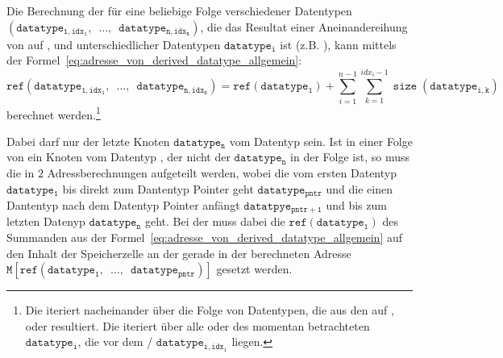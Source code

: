 \begin{Special_Paragraph}
  Die Berechnung der  für eine beliebige Folge verschiedener Datentypen $(\mathtt{datatype_{1, idx_1},\enspace\ldots,\enspace datatype_{n, idx_n}})$, die das Resultat einer Aneinandereihung von  auf ,  und  unterschiedlicher Datentypen $\mathtt{datatype_{i}}$ ist (z.B. ), kann mittels der Formel~\ref{eq:adresse_von_derived_datatype_allgemein}:
  \begin{equation}
  \mathtt{ref(datatype_{1, idx_1},\enspace\ldots,\enspace datatype_{n, idx_n})} = \mathtt{ref(datatype_1)} + \sum_{i=1}^{n-1}\sum_{k=1}^{idx_i - 1} \mathtt{\operatorname{size}(datatype_{i, k})}
  \label{eq:adresse_von_derived_datatype_allgemein}
  \end{equation}
  berechnet werden.\footnote{Die  iteriert nacheinander über die Folge von Datentypen, die aus den  auf ,  oder  resultiert. Die  iteriert über alle  oder  des momentan betrachteten  $\mathtt{datatype_i}$, die vor dem  /  $\mathtt{datatype_{i, idx_i}}$ liegen.}

  Dabei darf nur der letzte Knoten $\mathtt{datatype_n}$ vom Datentyp  sein. Ist in einer Folge von   ein Knoten vom Datentyp , der nicht der  $\mathtt{datatype_n}$ in der Folge ist, so muss die  in $2$ Adressberechnungen aufgeteilt werden, wobei die  vom ersten Datentyp $\mathtt{datatype_1}$ bis direkt zum Dantentyp Pointer geht $\mathtt{datatype_{pntr}}$ und die  einen Dantentyp nach dem Datentyp Pointer anfängt $\mathtt{datatpye_{pntr+1}}$ und bis zum letzten Datenyp $\mathtt{datatype_n}$ geht. Bei der  muss dabei die  $\mathtt{ref(datatype_1)}$ des Summanden aus der Formel~\ref{eq:adresse_von_derived_datatype_allgemein} auf den Inhalt der Speicherzelle an der gerade in der  berechneten Adresse $\mathtt{M\left[ref(datatype_1,\enspace\ldots,\enspace datatype_{pntr})\right]}$ gesetzt werden.


\end{Special_Paragraph}
